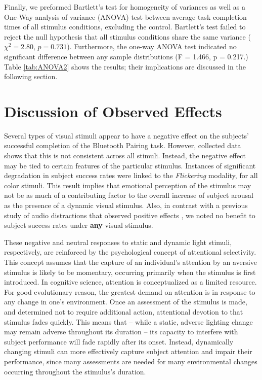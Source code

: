 \documentclass{llncs}
\begin{document}
Finally, we preformed Bartlett's test for homogeneity of variances as well as a One-Way 
analysis of variance (ANOVA) test between average task completion times of all stimulus conditions, excluding the control. 
Bartlett's test failed to reject the null hypothesis that all stimulus conditions share the same 
variance ($\chi^2 = 2.80$, $p = 0.731$). Furthermore, the one-way ANOVA test indicated no 
significant difference between any sample distributions (F = 1.466, p = 0.217.) 
Table \ref{tab:ANOVA2} shows the results; their implications are discussed in the following section. 
%

\section{Discussion of Observed Effects} 
\label{sec:discussion}
%
Several types of visual stimuli appear to have a negative effect 
on the subjects' successful completion of the Bluetooth Pairing task. However, 
collected data shows that this is not consistent across all stimuli. Instead, the 
negative effect may be tied to certain features of the particular stimulus. Instances 
of significant degradation in subject success rates were linked to the {\em Flickering} modality, for 
all color stimuli. This result implies that emotional perception of the stimulus may not be as much 
of a contributing factor to the overall increase of subject arousal as the presence of a 
dynamic visual stimulus. Also, in contrast with a previous study of audio distractions 
that observed positive effects \cite{kaczmarek_unattended_2015}, 
we noted no benefit to subject success rates under {\bf any} visual stimulus.

These negative and neutral responses to static and dynamic light stimuli, respectively, 
are reinforced by the psychological concept of attentional selectivity. This concept assumes 
that the capture of an individual's attention by an aversive stimulus is likely to be momentary, 
occurring primarily when the stimulus is first introduced.  In cognitive science, attention is 
conceptualized as a limited resource. For good evolutionary reason, the greatest demand on 
attention is in response to any change in one's environment. Once an assessment of the stimulus 
is made, and determined not to require additional action, attentional devotion to that stimulus 
fades quickly. This means that -- while a static, adverse lighting change may remain adverse
throughout its duration -- its capacity to interfere with subject performance will fade rapidly after 
its onset. Instead, dynamically changing stimuli can more effectively capture subject 
attention and impair their performance, since many assessments are needed for 
many environmental changes occurring throughout the stimulus's duration.
\end{document}

